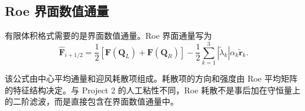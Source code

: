 \subsection{Roe 界面数值通量}

有限体积格式需要的是界面数值通量。Roe 界面通量写为
\begin{equation}
    \hat{\bm F}_{i+1/2}
    =
    \frac{1}{2}
    \left[
        \bm F(\bm Q_L)+\bm F(\bm Q_R)
    \right]
    -
    \frac{1}{2}
    \sum_{k=1}^{3}
    |\tilde\lambda_k|
    \alpha_k
    \tilde{\bm r}_k.
\end{equation}

该公式由中心平均通量和迎风耗散项组成。耗散项的方向和强度由 Roe 平均矩阵的特征结构决定。与 Project 2 的人工粘性不同，Roe 耗散不是事后加在守恒量上的二阶滤波，而是直接包含在界面数值通量中。
